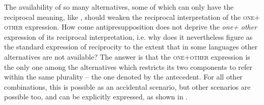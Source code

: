 \documentclass[output=paper,colorlinks,citecolor=brown]{langscibook}
\begin{document}
\noindent The availability of so many alternatives, some of which can only have the reciprocal meaning, like , should weaken the reciprocal interpretation of the \textsc{one$+$other} expression. How come antipresupposition does not deprive the \textit{one+ other} expression of its reciprocal interpretation, i.e. why does it nevertheless fi\-gure as the standard expression of reciprocity to the extent that in some languages other alternatives are not available? The answer is that the \textsc{one$+$other} expression is the only one among the alternatives which restricts its two components to refer within the same plurality -- the one denoted by the antecedent. For all other combinations, this is possible as an accidental scenario, but other scenarios are possible too, and can be explicitly expressed, as shown in .
\end{document}

